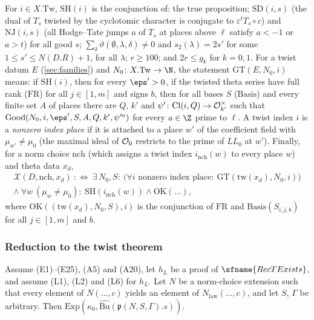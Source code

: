 \begin{definition}\label{pf:baselat1:def:exportAt}
For $i\in X.\mathrm{Tw}$, $\mathrm{SH}(i)$ is the conjunction of: the true proposition; $\mathrm{SD}(i,s)$
(the dual of $T_s$ twisted by the cyclotomic character is conjugate to $\varepsilon^{t}T_s\circ c$) and
$\mathrm{NJ}(i,s)$ (all Hodge--Tate jumps $a$ of $T_s$ at places above $\ell$ satisfy $a<-1$ or $a>t$) for
all good $s$; $\sum_\delta\vartheta(\emptyset,\lambda,\delta)\ne0$ and $s_2(\lambda)=2s'$ for some
$1\le s'\le N(D.R)+1$, for all $\lambda$; $r\ge100$; and $2r\le g_k$ for $k=0,1$. For a twist datum $E$
(\cref{sec:families}) and $N_0\colon X.\mathrm{Tw}\to\N$, the statement
$\mathrm{GT}(E,N_0,i)$ means: if $\mathrm{SH}(i)$, then for every $\eps'>0$, if
the twisted theta series have full rank ($\mathrm{FR}$) for all $j\in[1,m]$ and signs $b$, then for all
bases $S$ ($\mathrm{Basis}$) and every finite set $A$ of places there are $Q$, $k'$ and
$\psi'\colon\mathrm{Cl}(i,Q)\to\mathcal O_{k'}^\times$ such that $\mathrm{Good}(N_0,i,\eps',S,A,Q,k',\psi'^a)$
for every $a\in\Z$ prime to $\ell$. A twist index $i$ is a \emph{nonzero index place} if it is attached to a place
$w'$ of the coefficient field with $\mu_{w'}\ne\mu_0$ (the maximal ideal of $\mathcal O_0$ restricts to the prime
of $\mathit{LL}_0$ at $w'$). Finally, for a norm choice $\mathrm{nch}$ (which assigns a twist index
$i_{\mathrm{nch}}(w)$ to every place $w$) and theta data $x_d$,
\begin{multline*}
\mathcal{X}(D,\mathrm{nch},x_d)\ :\Longleftrightarrow\ \exists\,N_0,S:\ \bigl(\forall i\text{ nonzero
index place}:\ \mathrm{GT}(\mathrm{tw}(x_d),N_0,i)\bigr)\\
\wedge\ \forall w\ (\mu_w\ne\mu_0):\ \mathrm{SH}(i_{\mathrm{nch}}(w))\wedge\mathrm{OK}(\dots),
\end{multline*}
where $\mathrm{OK}((\mathrm{tw}(x_d),N_0,S),i)$ is the conjunction of $\mathrm{FR}$ and
$\mathrm{Basis}(S_{i,j,b})$ for all $j\in[1,m]$ and $b$.
\end{definition}

\subsubsection{Reduction to the twist theorem}

\begin{theorem}[Export]\label{pf:baselat1:export}
Assume (E1)--(E25), (A5) and (A20), let $h_L$ be a proof of $\sfname{RecTExists}$, and assume (L1), (L2) and
(L6) for $h_L$. Let $N$ be a norm-choice extension such that every element of $N(\dots,c)$ yields an element of
$N_{\mathrm{law}}(\dots,c)$, and let $S$, $\Gamma$ be arbitrary. Then
$\mathrm{Exp}(\kappa_0,\widehat{\mathrm{Bu}}(\mathfrak{p}(N,S,\Gamma).s))$.
\end{theorem}


